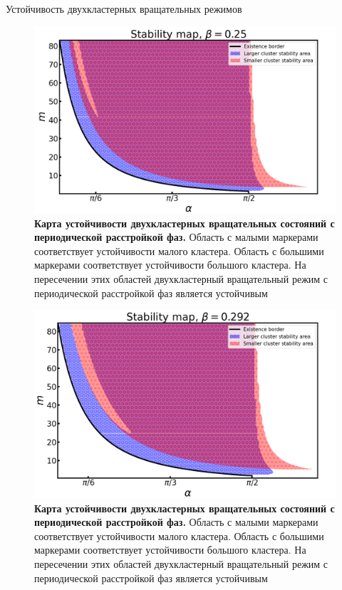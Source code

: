 \begin{chapter}{Устойчивость двухкластерных вращательных режимов}
	
	\begin{figure}[h!]\center
		\includegraphics[width=1\columnwidth]{pictures/map-0-25.png}
		\caption{\textbf{Карта устойчивости двухкластерных вращательных состояний с периодической расстройкой фаз.}
		Область с малыми маркерами соответствует устойчивости малого кластера.
		Область с большими маркерами соответствует устойчивости большого кластера.
		На пересечении этих областей двухкластерный вращательный режим с периодической расстройкой фаз является устойчивым}
		\label{map-025}
	\end{figure}


	\begin{figure}[h!]\center
		\includegraphics[width=1\columnwidth]{pictures/map-0-292.png}
		\caption{\textbf{Карта устойчивости двухкластерных вращательных состояний с периодической расстройкой фаз.}
		Область с малыми маркерами соответствует устойчивости малого кластера.
		Область с большими маркерами соответствует устойчивости большого кластера.
		На пересечении этих областей двухкластерный вращательный режим с периодической расстройкой фаз является устойчивым}
		\label{map-0-292}
	\end{figure}


\end{chapter}
